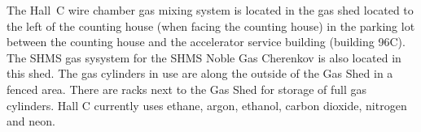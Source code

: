 
The Hall~C wire chamber gas mixing system is located in the gas shed located
to the left of the counting house (when facing the counting house)
in the parking lot between the counting house
and the accelerator service building (building 96C).  The SHMS gas sysystem for
the SHMS Noble Gas Cherenkov is also located in this shed.
The gas cylinders in use are along the outside of the Gas Shed
in a fenced area. There are racks next to the Gas Shed for storage
of full gas cylinders.  Hall C currently uses ethane, argon, ethanol,
carbon dioxide, nitrogen and neon.
